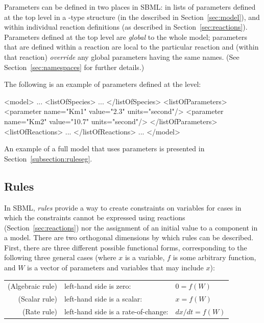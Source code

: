 \documentclass[10pt]{cekarticle}
\newcommand{\changed}[1]{\textcolor{BrickRed}{#1}}
\newenvironment{blockChanged}{\color{BrickRed}}{}
\begin{document}
Parameters \changed{can be defined} in two places in SBML: in lists of
parameters defined at the top level in a -type structure
\changed{(in the  described in
  Section~\ref{sec:model})}, and within individual reaction definitions
\changed{(as described in Section~\ref{sec:reactions})}.  Parameters
defined at the top level are \emph{global} to the whole model; parameters
that are defined within a reaction are local to the particular reaction and
(within that reaction) \emph{override} any global parameters having the
same names.  (See Section~\ref{sec:namespaces} for further details.)

\clearpage                           %

The following is an example of parameters defined at the  level:

\begin{example}
<model>
    ...
    <listOfSpecies>
        ...
    </listOfSpecies>
    <listOfParameters>
        <parameter name="Km1" value="2.3" units="second"/>
        <parameter name="Km2" value="10.7" units="second"/>
    </listOfParameters>
    <listOfReactions>
        ...
    </listOfReactions>
    ...
</model>
\end{example}

An example of a full model that uses parameters is presented in
Section~\ref{subsection:ruleseg}.


\subsection{Rules}
\label{sec:rules}

In SBML, \emph{rules} provide a way to create constraints on variables for
cases in which the constraints cannot be expressed using \changed{reactions
  (Section~\ref{sec:reactions}) nor the assignment of an initial value to a
  component in a model}.  There are two orthogonal dimensions by which
rules can be described.  First, there are three different possible
functional forms, corresponding to the following three general cases
\changed{(where $x$ is a variable, $f$ is some arbitrary function, and $W$
  is a vector of parameters and variables that may include $x$):}

\begin{blockChanged}
\begin{center}
\begin{tabular}{rll}
(Algebraic rule) & left-hand side is zero:             & $0 = f(W)$\\
(Scalar rule) 	& left-hand side is a scalar:         & $x = f(W)$\\
(Rate rule) 	& left-hand side is a rate-of-change: & $dx/dt = f(W)$
\end{tabular}
\end{center}
\end{blockChanged}
\end{document}
